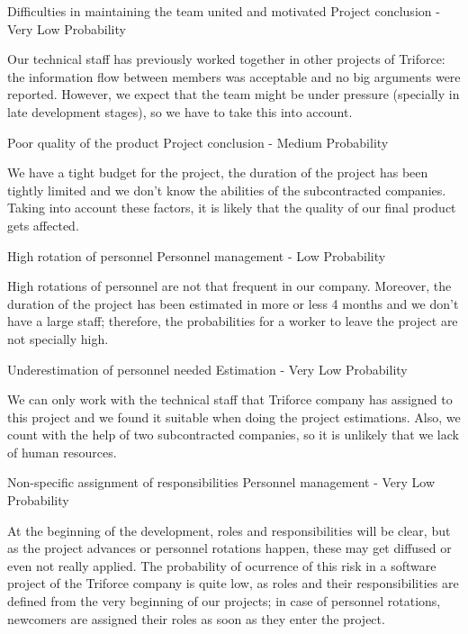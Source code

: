 \begin{risk}[riskMotivation]{Difficulties in maintaining the team united and motivated}
\riskcat Project conclusion
 - Very Low Probability

Our technical staff has previously worked together in other projects of Triforce: the information flow between members was acceptable and no big arguments were reported. However, we expect that the team might be under pressure (specially in late development stages), so we have to take this into account.
\end{risk}

\begin{risk}[riskQuality]{Poor quality of the product}
\riskcat Project conclusion
 - Medium Probability

We have a tight budget for the project, the duration of the project has been tightly limited and we don't know the abilities of the subcontracted companies. Taking into account these factors, it is likely that the quality of our final product gets affected.
\end{risk}

\begin{risk}[riskPersonnelRotation]{High rotation of personnel}
\riskcat Personnel management
 - Low Probability

High rotations of personnel are not that frequent in our company. Moreover, the duration of the project has been estimated in more or less 4 months and we don't have a large staff; therefore, the probabilities for a worker to leave the project are not specially high.
\end{risk}

\begin{risk}[riskPersonnelUnderestimation]{Underestimation of personnel needed}
\riskcat Estimation
 - Very Low Probability

We can only work with the technical staff that Triforce company has assigned to this project and we found it suitable when doing the project estimations. Also, we count with the help of two subcontracted companies, so it is unlikely that we lack of human resources.
\end{risk}

\begin{risk}[riskResponsibilitesAssignment]{Non-specific assignment of responsibilities}
\riskcat Personnel management
 - Very Low Probability

At the beginning of the development, roles and responsibilities will be clear, but as the project advances or personnel rotations happen, these may get diffused or even not really applied. The probability of ocurrence of this risk in a software project of the Triforce company is quite low, as roles and their responsibilities are defined from the very beginning of our projects; in case of personnel rotations, newcomers are assigned their roles as soon as they enter the project.
\end{risk}

